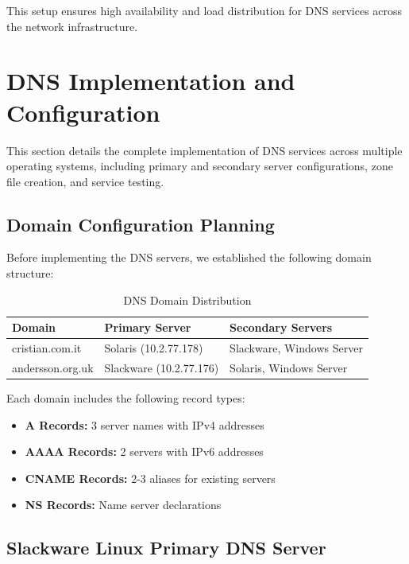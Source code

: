 \documentclass[12pt,a4paper]{article}
\begin{document}
This setup ensures high availability and load distribution for DNS services across the network infrastructure.

\section{DNS Implementation and Configuration}\label{sec:dns-implementation}

This section details the complete implementation of DNS services across multiple operating systems, including primary and secondary server configurations, zone file creation, and service testing.

\subsection{Domain Configuration Planning}\label{subsec:domain-planning}

Before implementing the DNS servers, we established the following domain structure:

\begin{table}[h]
\centering
\begin{tabular}{@{}lll@{}}
\toprule
\textbf{Domain} & \textbf{Primary Server} & \textbf{Secondary Servers} \\
\midrule
cristian.com.it & Solaris (10.2.77.178) & Slackware, Windows Server \\
andersson.org.uk & Slackware (10.2.77.176) & Solaris, Windows Server \\
\bottomrule
\end{tabular}
\caption{DNS Domain Distribution}
\label{tab:dns_domains}
\end{table}

Each domain includes the following record types:
\begin{itemize}
    \item \textbf{A Records:} 3 server names with IPv4 addresses
    \item \textbf{AAAA Records:} 2 servers with IPv6 addresses
    \item \textbf{CNAME Records:} 2-3 aliases for existing servers
    \item \textbf{NS Records:} Name server declarations
\end{itemize}

\subsection{Slackware Linux Primary DNS Server}\label{subsec:slackware-dns}
\end{document}
